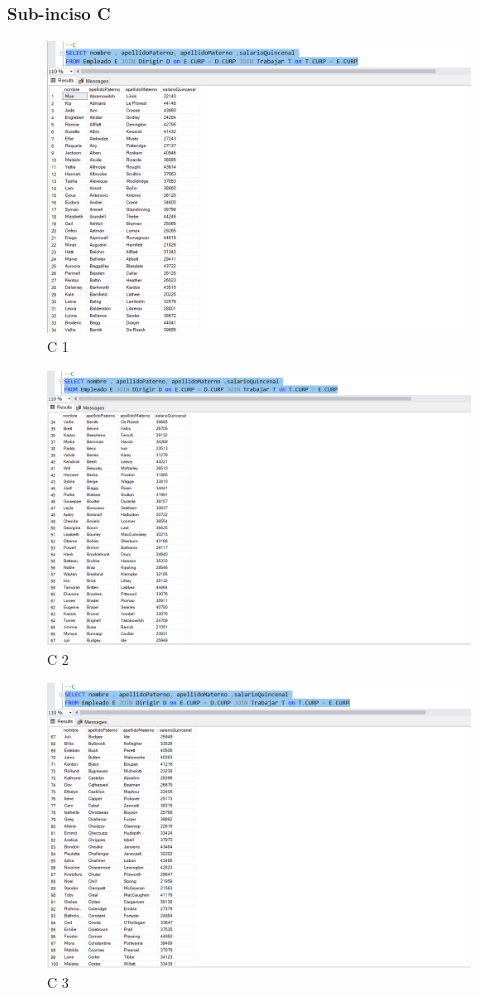 \documentclass[a4paper, 12pt]{report}
\begin{document}
\subsubsection*{Sub-inciso C}
    \begin{figure}
        \includegraphics[width=\textwidth]
            {img/C1.png}\hfill
    \caption{C 1}
    \end{figure}
    \begin{figure}
        \includegraphics[width=\textwidth]
            {img/C2.png}\hfill
    \caption{C 2}
    \end{figure}
    \begin{figure}
        \includegraphics[width=\textwidth]
            {img/C3.png}\hfill
    \caption{C 3}
    \end{figure}
\end{document}
